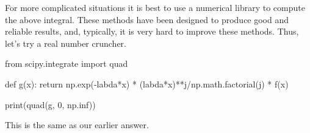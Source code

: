 \begin{exercise}
\begin{solution}
For more complicated situations it is best to use a
numerical library to compute the above integral. These methods have been
designed to produce good and reliable results, and, typically, it is
very hard to improve these methods. Thus, let's try a real number
cruncher.

\begin{pyconsole}
from scipy.integrate import quad

def g(x):
    return np.exp(-labda*x) * (labda*x)**j/np.math.factorial(j) * f(x)

print(quad(g, 0, np.inf))
\end{pyconsole}

This is the same as our earlier answer.
\end{solution}
\end{exercise}


\begin{comment}
\begin{exercise}[use=false]
  To analyze the distribution of $L$ of the $M/G/1$ we concentrated on
  the departure epochs. Why will this not help to find the
  distribution of $L$ for the $M/G/c$ queue?
  \begin{solution}
    \TBD.
  \end{solution}
\end{exercise}
\end{comment}







